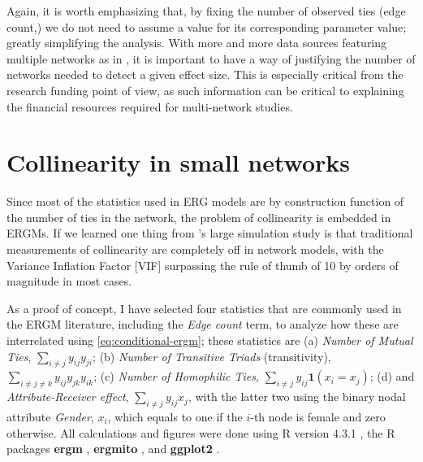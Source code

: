 \documentclass[12pt]{article}
\begin{document}
Again, it is worth emphasizing that, by fixing the number of observed ties (edge count,) we do not need to assume a value for its corresponding parameter value; greatly simplifying the analysis. With more and more data sources featuring multiple networks as in \cite{krivitskyTaleTwoDatasets2022}, it is important to have a way of justifying the number of networks needed to detect a given effect size. This is especially critical from the research funding point of view, as such information can be critical to explaining the financial resources required for multi-network studies.

\section{Collinearity in small networks}

Since most of the statistics used in ERG models are by construction function of the number of ties in the network, the problem of collinearity is embedded in ERGMs. If we learned one thing from \cite*{duxburyDiagnosingMulticollinearityExponential2021}'s large simulation study is that traditional measurements of collinearity are completely off in network models, with the Variance Inflation Factor [VIF] surpassing the rule of thumb of 10 by orders of magnitude in most cases.

As a proof of concept, I have selected four statistics that are commonly used in the ERGM literature, including the \textit{Edge count} term, to analyze how these are interrelated using \eqref{eq:conditional-ergm}; these statistics are (a) \textit{Number of Mutual Ties}, $\sum_{i\neq j}y_{ij}y_{ji}$; (b) \textit{Number of Transitive Triads} (transitivity), $\sum_{i\neq j\neq k}y_{ij}y_{jk}y_{ik}$; (c) \textit{Number of Homophilic Ties}, $\sum_{i\neq j}y_{ij}\mathbf{1}\left(x_i=x_j\right)$; (d) and \textit{Attribute-Receiver effect}, $\sum_{i\neq j}y_{ij}x_j$, with the latter two using the binary nodal attribute \textit{Gender}, $x_i$, which equals to one if the $i$-th node is female and zero otherwise. All calculations and figures were done using R version 4.3.1 \citep{R}, the R packages \textbf{ergm} \citep{hunterErgmPackageFit2008,handcockErgmFitSimulate2023,krivitskyErgm4NewFeatures2023}, \textbf{ergmito} \citep{ergmito,yonExponentialRandomGraph2021}, and \textbf{ggplot2} \citep{ggplot2}.

\bigskip
\end{document}
